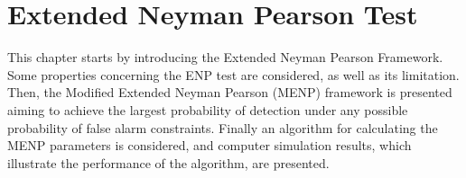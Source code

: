 \chapter{Extended Neyman Pearson Test}

\newcommand{\bom}{\boldsymbol{\omega}}
This chapter starts by introducing the Extended Neyman Pearson Framework. Some properties concerning the ENP test are considered, as well as its limitation. Then, the Modified Extended Neyman Pearson (MENP) framework is presented aiming to achieve the largest probability of detection under any possible probability of false alarm constraints. Finally an algorithm for calculating the MENP parameters is considered, and  computer simulation results, which illustrate the performance of the algorithm, are presented. 

\typeout{}


\typeout{}


\typeout{}


\typeout{}


\typeout{}

                     
